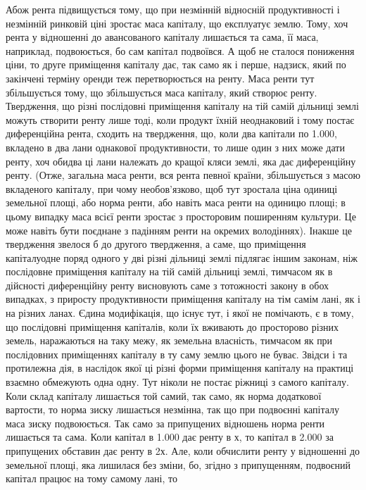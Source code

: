Абож рента підвищується тому, що при незмінній відносній продуктивності
і незмінній ринковій ціні зростає маса капіталу, що експлуатує землю.
Тому, хоч рента у відношенні до авансованого капіталу лишається та сама, її
маса, наприклад, подвоюється, бо сам капітал подвоївся. А щоб не сталося
пониження ціни, то друге приміщення капіталу дає, так само як і перше,
надзиск, який по закінчені терміну оренди теж перетворюється на ренту. Маса
ренти тут збільшується тому, що збільшується маса капіталу, який створює
ренту. Твердження, що різні послідовні приміщення капіталу на тій самій дільниці
землі можуть створити ренту лише тоді, коли продукт їхній неоднаковий
і тому постає диференційна рента, сходить на твердження, що, коли два капітали
по \num{1.000}, вкладено в два лани однакової продуктивности, то
лише один з них може дати ренту, хоч обидва ці лани належать до кращої
кляси землі, яка дає диференційну ренту. (Отже, загальна маса ренти, вся
рента певної країни, збільшується з масою вкладеного капіталу, при чому
необов’язково, щоб тут зростала ціна одиниці земельної площі, або норма
ренти, або навіть маса ренти на одиницю площі; в цьому випадку маса
всієї ренти зростає з просторовим поширенням культури. Це може навіть
бути поєднане з падінням ренти на окремих володіннях). Інакше це твердження
звелося б до другого твердження, а саме, що приміщення капіталуодне
поряд одного у дві різні дільниці землі підлягає іншим законам, ніж послідовне
приміщення капіталу на тій самій дільниці землі, тимчасом як в дійсності
диференційну ренту висновують саме з тотожності закону в обох випадках,
з приросту продуктивности приміщення капіталу на тім самім лані, як і на
різних ланах. Єдина модифікація, що існує тут, і якої не помічають, є в тому,
що послідовні приміщення капіталів, коли їх вживають до просторово різних
земель, наражаються на таку межу, як земельна власність, тимчасом як при послідовних
приміщеннях капіталу в ту саму землю цього не буває. Звідси і та
протилежна дія, в наслідок якої ці різні форми приміщення капіталу на практиці
взаємно обмежують одна одну. Тут ніколи не постає ріжниці з самого капіталу.
Коли склад капіталу лишається той самий, так само, як норма додаткової
вартости, то норма зиску лишається незмінна, так що при подвоєнні
капіталу маса зиску подвоюється. Так само за припущених відношень норма
ренти лишається та сама. Коли капітал в \num{1.000} дає ренту в х, то
капітал в \num{2.000} за припущених обставин дає ренту в 2х. Але, коли
обчислити ренту у відношенні до земельної площі, яка лишилася без зміни, бо,
згідно з припущенням, подвоєний капітал працює на тому самому лані, то
\parbreak{}  %
